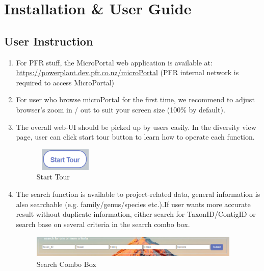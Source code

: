 \documentclass{scrreprt}
\begin{document}
\chapter{Installation \& User Guide} 

\section{User Instruction}
\begin{enumerate}
\item
For PFR stuff, the MicroPortal web application is available at:
\newline 
\url{https://powerplant.dev.pfr.co.nz/microPortal} 
\newline
(PFR internal network is required to access MicroPortal)
\newline
\item
For user who browse microPortal for the first time, we recommend to adjust browser's zoom in / out to suit your screen size (100\% by default).
\newline
\item
The overall web-UI should be picked up by users easily.
In the diversity view page, user can click start tour button to learn how to operate each function.
\begin{figure}[h!]
    \centering
    \includegraphics[width=3cm,height=30pt]{Start Tour.PNG}
    \caption{Start Tour}
    \label{fig:Start Tour}
\end{figure}
\item
The search function is available to project-related data, general information is also searchable (e.g. family/genus/species etc.).If user wants more accurate result without duplicate information, either search for TaxonID/ContigID or search base on several criteria in the search combo box.     \begin{figure}[h!]
    \centering
    \includegraphics[width=10cm,height=30pt]{search combo box.PNG}
    \caption{Search Combo Box}
    \label{fig:Start Tour}
\end{figure}   
\end{enumerate}
\end{document}
